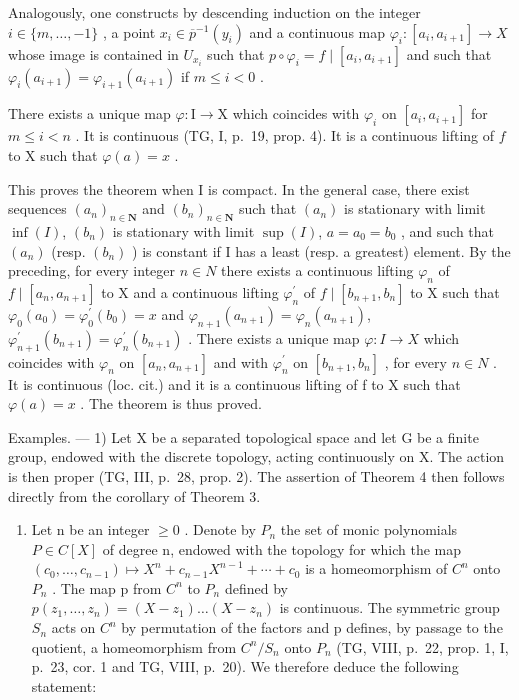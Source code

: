 Analogously, one constructs by descending induction on the integer \(i \in \{m, \ldots, -1\}\) , a point \(x_i \in \overline{p}^{-1}(y_i)\) and a continuous map \(\varphi_i: [a_i, a_{i+1}] \to X\) whose image is contained in \(U_{x_i}\) such that \(p \circ \varphi_i = f \mid [a_i, a_{i+1}]\) and such that \(\varphi_i(a_{i+1}) = \varphi_{i+1}(a_{i+1})\) if \(m \leqslant i < 0\) .

There exists a unique map \(\varphi\colon\mathrm{I}\to\mathrm{X}\) which coincides with \(\varphi_{i}\) on \([a_{i},a_{i+1}]\) for \(m\leqslant i<n\) . It is continuous (TG, I, p.~19, prop. 4). It is a continuous lifting of \(f\) to X such that \(\varphi(a)=x\) .

This proves the theorem when I is compact. In the general case, there exist sequences \((a_{n})_{n\in\mathbf{N}}\) and \((b_{n})_{n\in\mathbf{N}}\) such that \((a_{n})\) is stationary with limit \(\inf(I)\), \((b_{n})\) is stationary with limit \(\sup(I)\), \(a=a_{0}=b_{0}\) , and such that \((a_{n})\) (resp. \((b_{n})\) ) is constant if I has a least (resp. a greatest) element. By the preceding, for every integer \(n\in N\) there exists a continuous lifting \(\varphi_{n}\) of \(f\mid[a_{n},a_{n+1}]\) to X and a continuous lifting \(\varphi_{n}^{\prime}\) of \(f\mid[b_{n+1},b_n]\) to X such that \(\varphi_{0}(a_{0})=\varphi_{0}^{\prime}(b_{0})=x\) and \(\varphi_{n+1}(a_{n+1})=\varphi_{n}(a_{n+1})\), \(\varphi_{n+1}^{\prime}(b_{n+1})=\varphi_{n}^{\prime}(b_{n+1})\) . There exists a unique map \(\varphi\colon I\to X\) which coincides with \(\varphi_{n}\) on \([a_{n},a_{n+1}]\) and with \(\varphi_{n}^{\prime}\) on \([b_{n+1},b_{n}]\) , for every \(n\in N\) . It is continuous (loc. cit.) and it is a continuous lifting of f to X such that \(\varphi(a)=x\) . The theorem is thus proved.

Examples. --- 1) Let X be a separated topological space and let G be a finite group, endowed with the discrete topology, acting continuously on X. The action is then proper (TG, III, p.~28, prop. 2). The assertion of Theorem 4 then follows directly from the corollary of Theorem 3.

\begin{enumerate}
\def\labelenumi{\arabic{enumi})}
\setcounter{enumi}{1}
\tightlist
\item
  Let n be an integer \(\geqslant 0\) . Denote by \(P_{n}\) the set of monic polynomials \(P \in C[X]\) of degree n, endowed with the topology for which the map \((c_{0}, \ldots, c_{n-1}) \mapsto X^{n} + c_{n-1}X^{n-1} + \cdots + c_{0}\) is a homeomorphism of \(C^{n}\) onto \(P_{n}\) . The map p from \(C^{n}\) to \(P_{n}\) defined by \(p(z_{1}, \ldots, z_{n}) = (X - z_{1}) \ldots (X - z_{n})\) is continuous. The symmetric group \(S_{n}\) acts on \(C^{n}\) by permutation of the factors and p defines, by passage to the quotient, a homeomorphism from \(C^{n}/S_{n}\) onto \(P_{n}\) (TG, VIII, p.~22, prop. 1, I, p.~23, cor. 1 and TG, VIII, p.~20). We therefore deduce the following statement:
\end{enumerate}

